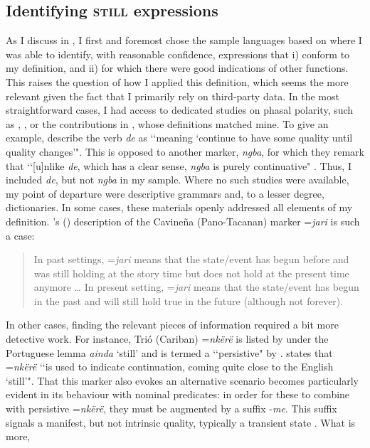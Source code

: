 \subsection{Identifying \textsc{still} expressions}
\label{sectionIdentifying}
As I discuss in , I first and foremost chose the sample languages based on where I was able to identify, with reasonable confidence, expressions that i) conform to my definition, and ii) for which there were good indications of other functions. This raises the question of how I applied this definition, which seems the more relevant given the fact that I primarily rely on third-party data. In the most straightforward cases, I had access to dedicated studies on phasal polarity, such as \textcite{vanBaar1997}, \textcite{vanderAuwera1998}, \textcite{Vandeweghe1992} or the contributions in \textcite{Kramer2021a}, whose definitions matched mine. To give an example, \textcite[113]{NassensteinPasch2021} describe the  verb \textit{de} as \lq\lq meaning \lq continue to have some quality until quality changes{'}". This is opposed to another  marker, \textit{ngba}, for which they remark that \lq\lq [u]nlike \textit{de}, which has a clear  sense, \textit{ngba} is purely continuative" \parencite[114]{NassensteinPasch2021}. Thus, I included  \textit{de}, but not \textit{ngba} in my sample. Where no such studies were available, my point of departure were descriptive grammars and, to a lesser degree, dictionaries. In some cases, these materials openly addressed all elements of my definition. \citeauthor{Guillaume2008}'s (\citeyear{Guillaume2008}) description of the Cavineña (Pano-Tacanan) marker \mbox{=\textit{jari}} is such a case:

\begin{quote}
In past  settings, =\textit{jari} means that the state/event has begun before and was still holding at the story time but does not hold at the present time anymore … In present  setting, =\textit{jari} means that the state/event has begun in the past and will still hold true in the future (although not forever). \parencite[660–661]{Guillaume2008}
\end{quote}

In other cases, finding the relevant pieces of information required a bit more detective work. For instance, Trió (Cariban) \mbox{=\textit{nkërë}} is listed by \textcite[15]{Letschert1998} under the Portuguese lemma \textit{ainda} \lq still' and is termed a \lq\lq persistive" by \textcite{Carlin2004}. \textcite[468]{Meira1999} states that \mbox{=\textit{nkërë}} \lq\lq is used to indicate continuation, coming quite close to the English \lq still{'}". That this marker also evokes an alternative scenario becomes particularly evident in its behaviour with nominal predicates: in order for these to combine with persistive \mbox{=\textit{nkërë}}, they must be augmented by a suffix \mbox{-\textit{me}}. This suffix signals a manifest, but not intrinsic quality, typically a transient state \parencite[123–124, 130]{Carlin2004}. What is more, 

